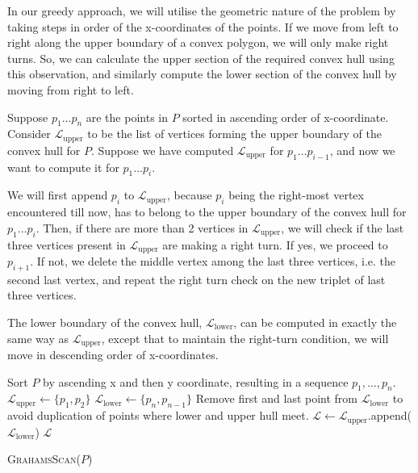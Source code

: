 \documentclass{article}
\begin{document}
In our greedy approach, we will utilise the geometric nature of the problem by taking steps in order of the x-coordinates of the points. If we move from left to right along the upper boundary of a convex polygon, we will only make right turns. So, we can calculate the upper section of the required convex hull using this observation, and similarly compute the lower section of the convex hull by moving from right to left.

Suppose $p_1 \ldots p_{n}$ are the points in $P$ sorted in ascending order of x-coordinate. Consider $\mathcal{L}_{\text{upper}}$ to be the list of vertices forming the upper boundary of the convex hull for $P$. Suppose we have computed $\mathcal{L}_{\text{upper}}$ for $p_1 \ldots p_{i-1}$, and now we want to compute it for $p_1 \ldots p_{i}$. 

We will first append $p_i$ to  $\mathcal{L}_{\text{upper}}$, because $p_i$ being the right-most vertex encountered till now, has to belong to the upper boundary of the convex hull for $p_1 \ldots p_{i}$. Then, if there are more than 2 vertices in $\mathcal{L}_{\text{upper}}$, we will check if the last three vertices present in $\mathcal{L}_{\text{upper}}$ are making a right turn. If yes, we proceed to $p_{i+1}$. If not, we delete the middle vertex among the last three vertices, i.e. the second last vertex, and repeat the right turn check on the new triplet of last three vertices.

The lower boundary of the convex hull, $\mathcal{L}_{\text{lower}}$, can be computed in exactly the same way as $\mathcal{L}_{\text{upper}}$, except that to maintain the right-turn condition, we will move in descending order of x-coordinates.

\begin{algorithm}[H]
\DontPrintSemicolon 
{}
Sort $P$ by ascending x and then y coordinate, resulting in a sequence $p_1, \ldots, p_n$.\;
$\mathcal{L}_{\text{upper}} \leftarrow \{p_1, p_2\} $\;
$\mathcal{L}_{\text{lower}} \leftarrow \{p_n, p_{n-1}\} $\;
Remove first and last point from $\mathcal{L}_{\text{lower}}$ to avoid duplication of points where lower and upper hull meet.\;
$\mathcal{L} \leftarrow \mathcal{L}_{\text{upper}}$.append( $\mathcal{L}_{\text{lower}}$)\;
\Return $\mathcal{L}$\;
\caption{\textsc{GrahamsScan}($P$)}
\end{algorithm}
\end{document}
